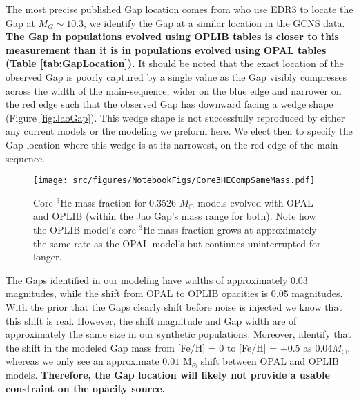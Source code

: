 The most precise published Gap location comes from \citet{Jao2020} who use EDR3
to locate the Gap at $M_{G} \sim 10.3$, we identify the Gap at a similar
location in the GCNS data. \textbf{The Gap in populations evolved using OPLIB
tables is closer to this measurement than it is in populations evolved using
OPAL tables (Table \ref{tab:GapLocation}).} It should be noted that the exact
location of the observed Gap is poorly captured by a single value as the Gap
visibly compresses across the width of the main-sequence, wider on the blue
edge and narrower on the red edge such that the observed Gap has downward
facing a wedge shape (Figure \ref{fig:JaoGap}). This wedge shape is not
successfully reproduced by either any current models or the modeling we preform
here. We elect then to specify the Gap location where this wedge is at its
narrowest, on the red edge of the main sequence.

\begin{figure}
	\centering
	\texttt{[image: src/figures/NotebookFigs/Core3HECompSameMass.pdf]}
	\caption{Core $^{3}$He mass fraction for  0.3526 $M_{\odot}$ models evolved
	with OPAL and OPLIB (within the Jao Gap's mass range for both). Note how
	the OPLIB model's core $^{3}$He mass fraction grows at approximately the
	same rate as the OPAL model's but continues uninterrupted for longer.}
	\label{fig:OPALOPLIB3He}
\end{figure}

The Gaps identified in our modeling have widths of approximately 0.03
magnitudes, while the shift from OPAL to OPLIB opacities is 0.05 magnitudes.
With the prior that the Gaps clearly shift before noise is injected we know
that this shift is real. However, the shift magnitude and Gap width are of
approximately the same size in our synthetic populations. Moreover,
\citet{Feiden2021} identify that the shift in the modeled Gap mass from [Fe/H]
= 0 to [Fe/H] = +0.5 as 0.04$M_{\odot}$, whereas we only see an approximate
$0.01$ M$_{\odot}$ shift between OPAL and OPLIB models. \textbf{Therefore, the
Gap location will likely not provide a usable constraint on the opacity
source.} 
